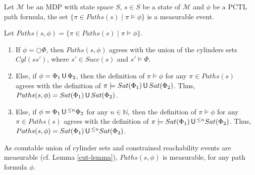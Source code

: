 \begin{theorem}
  Let $\mathcal{M}$ be an MDP with state space $S$, $s \in S$ be a state of $\mathcal{M}$ and $\phi$ be a PCTL path formula, the set $\{ \pi \in Paths(s) \; | \; \pi \models \phi \}$ is a measurable event.
\end{theorem}

\begin{proof2}
Let $Paths(s, \phi) = \{ \pi \in Paths(s) \; | \; \pi \models \phi \}$.
\begin{enumerate}
  \item If $\phi = \bigcirc \Phi$, then $Paths(s, \phi)$ agrees with the union of the cylinders sets $Cyl(ss')$, where $s' \in Succ(s)$ and $s' \models \Phi$.
  \item Else, if $\phi = \Phi_1 \,\text{\sffamily U}\, \Phi_2$, then the definition of
  $\pi \models \phi$ for any $\pi \in Paths(s)$ agrees with the definition of
  $\pi \models Sat(\Phi_1) \,\text{\sffamily U}\, Sat(\Phi_2)$.
  Thus, $Paths(s, \phi) = Sat(\Phi_1) \,\text{\sffamily U}\, Sat(\Phi_2)$.
  \item Else, if $\phi = \Phi_1 \,\text{\sffamily U}\,^{\leq n}\Phi_2$ for any $n \in \mathbb{N}$, then the definition of
  $\pi \models \phi$ for any $\pi \in Paths(s)$ agrees with the definition of
  $\pi \models Sat(\Phi_1) \,\text{\sffamily U}\,^{\leq n} Sat(\Phi_2)$.
  Thus, $Paths(s, \phi) = Sat(\Phi_1) \,\text{\sffamily U}\,^{\leq n} Sat(\Phi_2)$.
\end{enumerate}
As countable union of cylinder sets and constrained reachability events are measurable (cf. Lemma \ref{cut-lemma}), $Paths(s, \phi)$ is measurable, for any path formula $\phi$.

\end{proof2}
$ $\\
